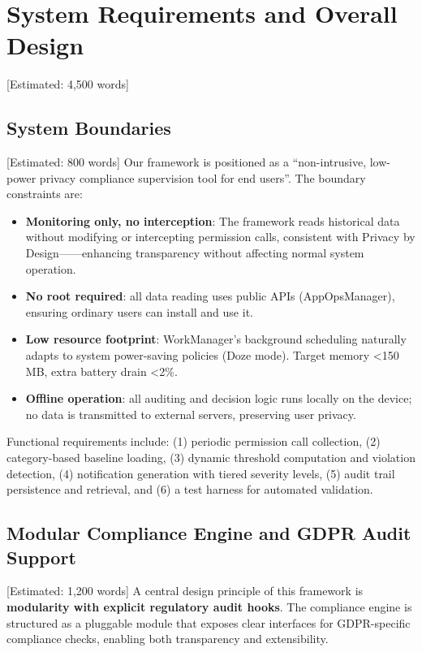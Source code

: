 \newpage\section{System Requirements and Overall Design} [Estimated: 4,500 words]

\subsection{System Boundaries} [Estimated: 800 words]
Our framework is positioned as a ``non-intrusive, low-power privacy compliance supervision tool for end users''. The boundary constraints are:

\begin{itemize}
\item \textbf{Monitoring only, no interception}: The framework reads historical data without modifying or intercepting permission calls, consistent with Privacy by Design——enhancing transparency without affecting normal system operation.
\item \textbf{No root required}: all data reading uses public APIs (AppOpsManager), ensuring ordinary users can install and use it.
\item \textbf{Low resource footprint}: WorkManager's background scheduling naturally adapts to system power-saving policies (Doze mode). Target memory <150 MB, extra battery drain <2\%.
\item \textbf{Offline operation}: all auditing and decision logic runs locally on the device; no data is transmitted to external servers, preserving user privacy.
\end{itemize}

Functional requirements include: (1) periodic permission call collection, (2) category-based baseline loading, (3) dynamic threshold computation and violation detection, (4) notification generation with tiered severity levels, (5) audit trail persistence and retrieval, and (6) a test harness for automated validation.

\subsection{Modular Compliance Engine and GDPR Audit Support} [Estimated: 1,200 words]
A central design principle of this framework is \textbf{modularity with explicit regulatory audit hooks}. The compliance engine is structured as a pluggable module that exposes clear interfaces for GDPR-specific compliance checks, enabling both transparency and extensibility.

